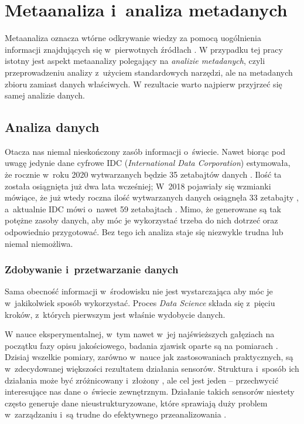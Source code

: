 \chapter{Metaanaliza i~analiza metadanych}

Metaanaliza oznacza wtórne odkrywanie wiedzy za pomocą uogólnienia informacji znajdujących się w~pierwotnych źródłach \cite{higgins2019cochrane}.
W przypadku tej pracy istotny jest aspekt metaanalizy polegający na \textit{analizie metadanych}, czyli przeprowadzeniu analizy z~użyciem standardowych narzędzi, ale na metadanych zbioru zamiast danych właściwych.
W rezultacie warto najpierw przyjrzeć się samej analizie danych.

\section{Analiza danych}

Otacza nas niemal nieskończony zasób informacji o~świecie.
Nawet biorąc pod uwagę jedynie dane cyfrowe IDC (\textit{International Data Corporation}) estymowała, że rocznie w~roku 2020 wytwarzanych będzie 35 zetabajtów danych \cite{tien2013big}.
Ilość ta została osiągnięta już dwa lata wcześniej; W~2018 pojawiały się wzmianki mówiące, że już wtedy roczna ilość wytwarzanych danych osiągnęła 33 zetabajty \cite{Patrizio:2018}, a~aktualnie IDC mówi o~nawet 59 zetabajtach \cite{IDC:2020}.
Mimo, że generowane są tak potężne zasoby danych, aby móc je wykorzystać trzeba do nich dotrzeć oraz odpowiednio przygotować.
Bez tego ich analiza staje się niezwykle trudna lub niemal niemożliwa.

	\subsection{Zdobywanie i~przetwarzanie danych}
	Sama obecność informacji w~środowisku nie jest wystarczająca aby móc je w~jakikolwiek sposób wykorzystać.
	Proces \textit{Data Science} składa się z~pięciu kroków, z~których pierwszym jest właśnie wydobycie danych.

	W nauce eksperymentalnej, w~tym nawet w~jej najświeższych gałęziach na początku fazy opisu jakościowego, badania zjawisk oparte są na pomiarach \cite{brandt1998data}.
	Dzisiaj wszelkie pomiary, zarówno w~nauce jak zastosowaniach praktycznych, są w~zdecydowanej większości rezultatem działania sensorów.
	Struktura i~sposób ich działania może być zróżnicowany i~złożony \cite{deshpande2004model,boyer2009scada}, ale cel jest jeden -- przechwycić interesujące nas dane o~świecie zewnętrznym.
	Działanie takich sensorów niestety często generuje dane nieustrukturyzowane, które sprawiają duży problem w~zarządzaniu i~są trudne do efektywnego przeanalizowania \cite{blumberg2003problem}.

